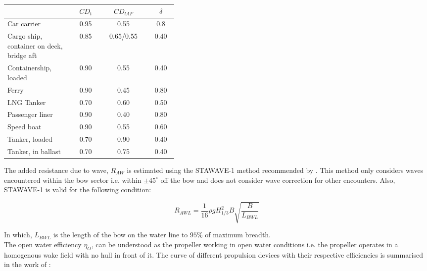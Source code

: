 \documentclass[]{interact}
\theoremstyle{plain}%
\theoremstyle{definition}
\theoremstyle{remark}
\begin{document}
\begin{table}
  {\begin{tabular}{ p{0.4\linewidth} c c c }
  \hline
  &\textbf{$CD_t$} & \textbf{$CD_{lAF}$} & \textbf{$\delta$} \\
  \hline
  Car carrier & 0.95 & 0.55 & 0.8 \\
  Cargo ship, container on deck, bridge aft & 0.85 & 0.65/0.55 & 0.40 \\
  Containership, loaded & 0.90 & 0.55 & 0.40 \\
  Ferry & 0.90 & 0.45 & 0.80\\
  LNG Tanker & 0.70 & 0.60 & 0.50 \\
  Passenger liner & 0.90 & 0.40 & 0.80 \\
  Speed boat & 0.90 & 0.55 & 0.60 \\
  Tanker, loaded & 0.70 & 0.90 & 0.40 \\
  Tanker, in ballast & 0.70 & 0.75 & 0.40 \\
  \hline        
  \end{tabular}}
  \label{tbl:BlendermannCoeff}
\end{table}

The added resistance due to wave, $R_{AW}$ is estimated using the STAWAVE-1 method recommended by \citet{ITTCProcedures.2014}. This method only considers waves encountered within the bow sector i.e. within $\pm 45^\circ$ off the bow and does not consider wave correction for other encounters. Also, STAWAVE-1 is valid for the following condition:

\begin{equation}
  \label{eqn:stawave1}
  R_{AWL} = \frac{1}{16}\rho g H_{1/3}^2 B \sqrt{\frac{B}{L_{BWL}}} 
\end{equation}

In which, $L_{BWL}$ is the length of the bow on the water line to $95\%$ of maximum breadth.\\

The open water efficiency \begin{math}\eta_O\end{math}, can be understood as the propeller working in open water conditions i.e. the propeller operates in a homogenous wake field with no hull in front of it. The curve of different propulsion devices with their respective efficiencies is summarised in the work of \citet{Breslin.1994}:\\
\end{document}
